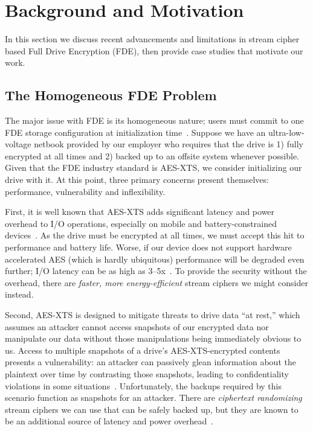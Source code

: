 \section{Background and Motivation}\label{sec:motivation}

In this section we discuss recent advancements and limitations in stream cipher
based Full Drive Encryption (FDE), then provide \numCases case studies that
motivate our work.


\subsection{The Homogeneous FDE Problem}

The major issue with FDE is its homogeneous nature; users must commit to one FDE
storage configuration at initialization time~\cite{dmcrypt}. Suppose we have an
ultra-low-voltage netbook provided by our employer who requires that the drive
is 1) fully encrypted at all times and 2) backed up to an offsite system
whenever possible. Given that the FDE industry standard is AES-XTS, we consider
initializing our drive with it. At this point, three primary concerns present
themselves: performance, vulnerability and inflexibility.

First, it is well known that AES-XTS adds significant latency and
power overhead to I/O operations, especially on mobile and
battery-constrained devices~\cite{google-engadget,
  android-M-mobile-motivation, android-M-mobile-motivation-2}. As the
drive must be encrypted at all times, we must accept this hit to
performance and battery life. Worse, if our device does not support
hardware accelerated AES (which is hardly ubiquitous) performance will
be degraded even further; I/O latency can be as high as
3--5x~\cite{StrongBox}. To provide the security without the overhead,
there are {\em faster, more energy-efficient} stream ciphers we might
consider instead.

Second, AES-XTS is designed to mitigate threats to drive data ``at rest,'' which
assumes an attacker cannot access snapshots of our encrypted data nor manipulate
our data without those manipulations being immediately obvious to us. Access to
multiple snapshots of a drive's AES-XTS-encrypted contents presents a
vulnerability: an attacker can passively glean information about the plaintext
over time by contrasting those snapshots, leading to confidentiality violations
in some situations~\cite{XEX, XTS}. Unfortunately, the backups required by this
scenario function as snapshots for an attacker. There are {\em ciphertext
randomizing} stream ciphers we can use that can be safely backed up, but they are
known to be an additional source of latency and power overhead~\cite{Freestyle}.


